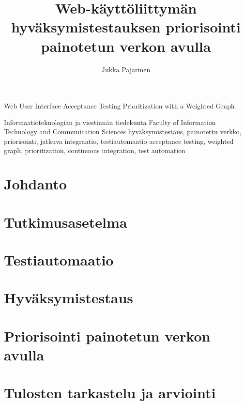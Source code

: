 \documentclass[finnish, authoryear]{config/tauthesis}
\theoremstyle{definition}
\begin{document}
\frontmatter
\title
  {Web-käyttöliittymän hyväksymistestauksen priorisointi painotetun verkon avulla}
  {Web User Interface Acceptance Testing Prioritization with a Weighted Graph}
\subtitle{}{}
\author{Jukka Pajarinen}
\facultyname
  {Informaatioteknologian ja viestinnän tiedekunta}
  {Faculty of Information Technology and Communication Sciences}
\keywords
  {hyväksymistestaus, painotettu verkko, priorisointi, jatkuva integraatio, testiautomaatio}
  {acceptance testing, weighted graph, prioritization, continuous integration, test automation}
\maketitle
{}
\tableofcontents
\listoffigures
\listoftables
\glossary

\mainmatter
\chapter{Johdanto} \label{ch:05_johdanto}
  
\chapter{Tutkimusasetelma} \label{ch:06_tutkimusasetelma}
  
\chapter{Testiautomaatio} \label{ch:07_testiautomaatio}
  
\chapter{Hyväksymistestaus} \label{ch:08_hyvaksymistestaus}
  
\chapter{Priorisointi painotetun verkon avulla} \label{ch:09_priorisointi_painotetun_verkon_avulla}
  
\chapter{Tulosten tarkastelu ja arviointi} \label{ch:10_tulosten_tarkastelu_ja_arviointi}
  
\end{document}
